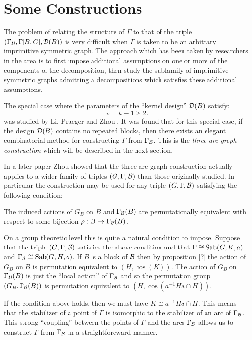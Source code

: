 \chapter{Some Constructions}

The problem of relating the structure of $\Gamma$ 
to that of the triple $(\Gamma_{\mathcal{B}}, \Gamma[B,C], \mathcal{D}(B))$
is very difficult when $\Gamma$ is taken to be 
an arbitrary imprimitive symmetric graph.
The approach which has been taken by researchers in the area
is to first impose additional assumptions 
on one or more of the components of the decomposition,
then study the subfamily of imprimitive symmetric graphs 
admitting a decompositions which satisfies these additional assumptions.

The special case where the parameters of the ``kernel design'' $\mathcal{D}(B)$
satisfy: $$v = k-1 \geq 2.$$
was studied by Li, Praeger and Zhou \cite{ZCP2000}.
It was found that for this special case, 
if the design $\mathcal{D}(B)$ contains no repeated blocks,
then there exists an elegant combinatorial method
for constructing $\Gamma$ from $\Gamma_{\mathcal{B}}$.
This is the {\it three-arc graph construction} which will
be described in the next section.

In a later paper Zhou \cite{ZDM2002} showed that 
the three-arc graph construction actually applies 
to a wider family of triples $(G, \Gamma, \mathcal{B})$
than those originally studied.
In particular the construction may be used for any triple $(G, \Gamma, \mathcal{B})$
satisfying the following condition:  

\begin{condition}
The induced actions of $G_B$ on $B$ and $\Gamma_{\mathcal{B}}(B)$
are permutationally equivalent with respect to some bijection
$\rho : B \to \Gamma_{\mathcal{B}}(B)$.
\end{condition}

On a group theoretic level this is quite a natural condition to impose.
Suppose that the triple $(G,\Gamma, \mathcal{B})$ satisfies the above condition
and that $\Gamma \cong \operatorname{Sab}(G,K,a)$ 
and $\Gamma_{\mathcal{B}} \cong \operatorname{Sab}(G,H,a)$.
If $B$ is a block of $\mathcal{B}$ then
by proposition [?] the action of $G_B$ on $B$
is permutation equivalent to $(H, \cos(K))$.
The action of $G_B$ on $\Gamma_{\mathcal{B}}(B)$ 
is just the ``local action'' of $\Gamma_{\mathcal{B}}$
and so the permutation group $(G_B, \Gamma_{\mathcal{B}}(B))$
is permutation equivalent to $(H, \cos(a^{-1}Ha \cap H))$.

If the condition above holds, 
then we must have $K \cong a^{-1}Ha \cap H$.
This means that the stabilizer of a point of $\Gamma$ is isomorphic
to the stabilizer of an arc of $\Gamma_{\mathcal{B}}$.
This strong ``coupling'' between the points of $\Gamma$
and the arcs $\Gamma_{\mathcal{B}}$ allows us to construct
$\Gamma$ from $\Gamma_{\mathcal{B}}$ in a straightforeward manner.

